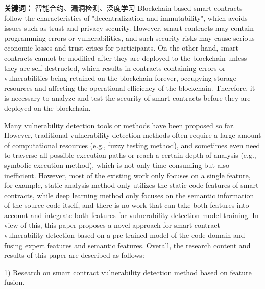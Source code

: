     {\noindent \textbf{关键词：} 智能合约、漏洞检测、深度学习}
\cleardoublepage
{}
Blockchain-based smart contracts follow the characteristics of "decentralization and immutability", which avoids issues such as trust and privacy security. However, smart contracts may contain programming errors or vulnerabilities, and such security risks may cause serious economic losses and trust crises for participants. On the other hand, smart contracts cannot be modified after they are deployed to the blockchain unless they are self-destructed, which results in contracts containing errors or vulnerabilities being retained on the blockchain forever, occupying storage resources and affecting the operational efficiency of the blockchain. Therefore, it is necessary to analyze and test the security of smart contracts before they are deployed on the blockchain.

Many vulnerability detection tools or methods have been proposed so far. However, traditional vulnerability detection methods often require a large amount of computational resources (e.g., fuzzy testing method), and sometimes even need to traverse all possible execution paths or reach a certain depth of analysis (e.g., symbolic execution method), which is not only time-consuming but also inefficient. However, most of the existing work only focuses on a single feature, for example, static analysis method only utilizes the static code features of smart contracts, while deep learning method only focuses on the semantic information of the source code itself, and there is no work that can take both features into account and integrate both features for vulnerability detection model training. In view of this, this paper proposes a novel approach for smart contract vulnerability detection based on a pre-trained model of the code domain and fusing expert features and semantic features. Overall, the research content and results of this paper are described as follows:

    1) Research on smart contract vulnerability detection method based on feature fusion.
    
